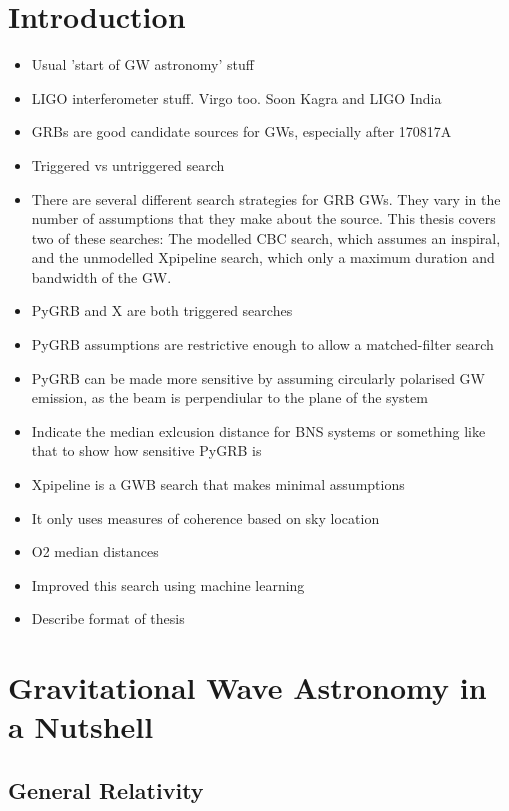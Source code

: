 \documentclass[11pt]{cuthesis}
\begin{document}
\chapter{Introduction}
\begin{itemize}
\item Usual 'start of GW astronomy' stuff
\item LIGO interferometer stuff. Virgo too. Soon Kagra and LIGO India
\item GRBs are good candidate sources for GWs, especially after 170817A
\item Triggered vs untriggered search
\item There are several different search strategies for GRB GWs. They vary in the number of assumptions that they make about the source. This thesis covers two of these searches: The modelled CBC search, which assumes an inspiral, and the unmodelled Xpipeline search, which only a maximum duration and bandwidth of the GW.
\item PyGRB and X are both triggered searches
\item PyGRB assumptions are restrictive enough to allow a matched-filter search 
\item PyGRB can be made more sensitive by assuming circularly polarised GW emission, as the beam is perpendiular to the plane of the system
\item Indicate the median exlcusion distance for BNS systems or something like that to show how sensitive PyGRB is
\item Xpipeline is a GWB search that makes minimal assumptions
\item It only uses measures of coherence based on sky location
\item O2 median distances
\item Improved this search using machine learning
\item Describe format of thesis
\end{itemize}


\chapter{Gravitational Wave Astronomy in a Nutshell} \label{chap: gw bg}
\section{General Relativity}
\end{document}
